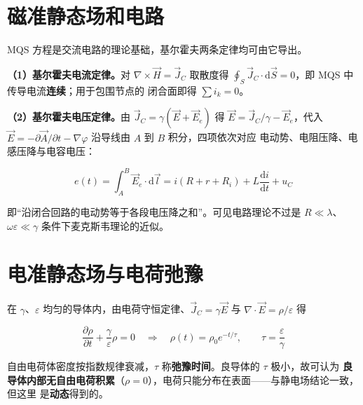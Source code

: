 
\section{磁准静态场和电路}

MQS 方程是交流电路的理论基础，基尔霍夫两条定律均可由它导出。

\textbf{（1）基尔霍夫电流定律。}对 $\nabla\times\vec{H}=\vec{J}_C$ 取散度得
$\oint_S\vec{J}_C\cdot \mathrm{d}\vec{S}=0$，即 MQS 中传导电流\textbf{连续}；用于包围节点的
闭合面即得 $\sum i_k=0$。

\textbf{（2）基尔霍夫电压定律。}由 $\vec{J}_C=\gamma(\vec{E}+\vec{E}_e)$ 得
$\vec{E}=\vec{J}_C/\gamma-\vec{E}_e$，代入
$\vec{E}=-\partial\vec{A}/\partial t-\nabla\varphi$ 沿导线由 $A$ 到 $B$ 积分，四项依次对应
电动势、电阻压降、电感压降与电容电压：

\begin{formulaBox}
\[
e(t)=\int_{A}^{B}\vec{E}_e\cdot \mathrm{d}\vec{l}
=i\left(R+r+R_i\right)+L\frac{\mathrm{d}i}{\mathrm{d}t}+u_C
\]
\end{formulaBox}
即“沿闭合回路的电动势等于各段电压降之和”。可见电路理论不过是 $R\ll\lambda$、
$\omega\varepsilon\ll\gamma$ 条件下麦克斯韦理论的近似。


\section{电准静态场与电荷弛豫}

在 $\gamma$、$\varepsilon$ 均匀的导体内，由电荷守恒定律、$\vec{J}_C=\gamma\vec{E}$ 与
$\nabla\cdot\vec{E}=\rho/\varepsilon$ 得

\begin{formulaBox}
\[
\frac{\partial\rho}{\partial t}+\frac{\gamma}{\varepsilon}\rho=0
\quad\Longrightarrow\quad
\rho(t)=\rho_0e^{-t/\tau},
\qquad
\tau=\frac{\varepsilon}{\gamma}
\]
\end{formulaBox}

自由电荷体密度按指数规律衰减，$\tau$ 称\textbf{弛豫时间}。良导体的 $\tau$ 极小，故可认为
\textbf{良导体内部无自由电荷积累}（$\rho=0$），电荷只能分布在表面——与静电场结论一致，但这里
是\textbf{动态}得到的。

